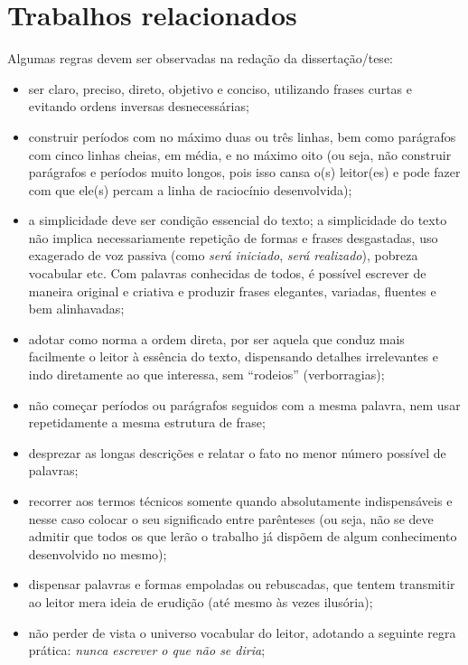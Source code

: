 \chapter{Trabalhos relacionados}
\label{cap:capitulo3}


Algumas regras devem ser observadas na redação da dissertação/tese: 

\begin{itemize}
   \item ser claro, preciso, direto, objetivo e conciso, utilizando frases curtas e evitando ordens inversas desnecessárias;
   \item construir períodos com no máximo duas ou três linhas, bem como parágrafos com cinco linhas cheias, em média, e no máximo oito (ou seja, não construir parágrafos e períodos muito longos, pois isso cansa o(s) leitor(es) e pode fazer com que ele(s) percam a linha de raciocínio desenvolvida);
   \item a simplicidade deve ser condição essencial do texto; a simplicidade do texto não implica necessariamente repetição de formas e frases desgastadas, uso exagerado de voz passiva (como \textit{será iniciado}, \textit{será realizado}), pobreza vocabular etc. Com palavras conhecidas de todos, é possível escrever de maneira original e criativa e produzir frases elegantes, variadas, fluentes e bem alinhavadas;
   \item adotar como norma a ordem direta, por ser aquela que conduz mais facilmente o leitor à essência do texto, dispensando detalhes irrelevantes e indo diretamente ao que interessa, sem ``rodeios'' (verborragias);
   \item não começar períodos ou parágrafos seguidos com a mesma palavra, nem usar repetidamente a mesma estrutura de frase;
   \item desprezar as longas descrições e relatar o fato no menor número possível de palavras;
   \item recorrer aos termos técnicos somente quando absolutamente indispensáveis e nesse caso colocar o seu significado entre parênteses (ou seja, não se deve admitir que todos os que lerão o trabalho já dispõem de algum conhecimento desenvolvido no mesmo);
   \item dispensar palavras e formas empoladas ou rebuscadas, que tentem transmitir ao leitor mera ideia de erudição (até mesmo às vezes ilusória);
   \item não perder de vista o universo vocabular do leitor, adotando a seguinte regra prática: \textit{nunca escrever o que não se diria};

\end{itemize}
